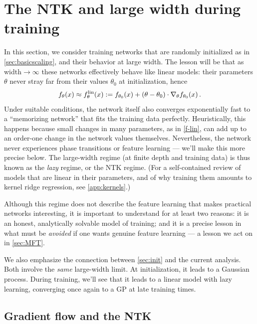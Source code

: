 \documentclass[11pt]{article}
\begin{document}
\section{The NTK and large width during training}
\label{sec:train}

In this section, we consider training networks that are randomly initialized as in \cref{sec:basicscaling}, and their behavior at large width. The lesson will be that as width$\to\infty$ these networks effectively behave like linear models: their parameters $\theta$ never stray far from their values $\theta_0$ at initialization, hence
%
\begin{equation}
    f_\theta(x) \approx f^{\rm lin}_\theta(x) := f_{\theta_0}(x) + (\theta-\theta_0)\cdot \nabla_\theta f_{\theta_0}(x)\,. \label{f-lin}
\end{equation} 
%
Under suitable conditions, the network itself also converges exponentially fast to a ``memorizing network'' that fits the training data perfectly. Heuristically, this happens because small changes in many parameters, as in \eqref{f-lin}, can add up to an order-one change in the network values themselves. Nevertheless, the network never experiences phase transitions or feature learning --- we'll make this more precise below. The large-width regime (at finite depth and training data) is thus known as the \emph{lazy} regime, or the NTK regime. (For a self-contained review of models that are linear in their parameters, and of why training them amounts to kernel ridge regression, see \cref{app:kernels}.)

Although this regime does not describe the feature learning that makes practical networks interesting, it is important to understand for at least two reasons: it is an honest, analytically solvable model of training; and it is a precise lesson in what must be \emph{avoided} if one wants genuine feature learning --- a lesson we act on in \cref{sec:MFT}.

We also emphasize the connection between \cref{sec:init} and the current analysis. Both involve the \emph{same} large-width limit. At initialization, it leads to a Gaussian process. During training, we'll see that it leads to a linear model with lazy learning, converging once again to a GP at late training times.


\subsection{Gradient flow and the NTK}
\label{sec:NTK}
\end{document}
